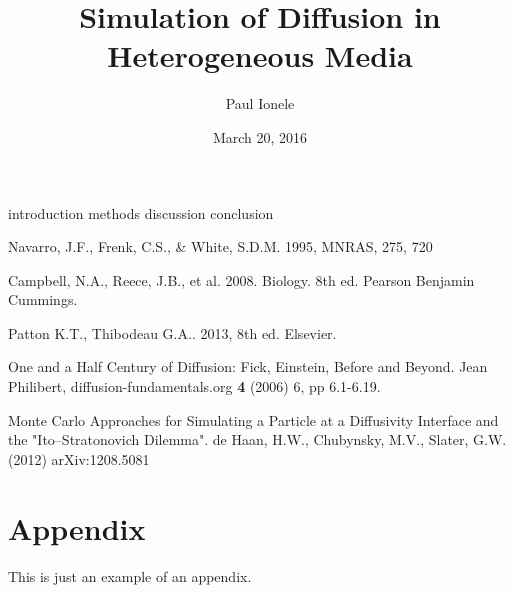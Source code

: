 \documentclass{jthesis}
\title{Simulation of Diffusion in Heterogeneous Media}
\date{March 20, 2016}
\author{Paul Ionele}
\begin{document}
\maketitle



\makedeclaration

\maketableofcontents

\doublespacing

{introduction}
\newpage
{methods}
\newpage
{discussion}
\newpage
{conclusion}

\begin{thebibliography}{}

 Navarro, J.F., Frenk, C.S., \& White, S.D.M.  1995, MNRAS, 275, 720

 Campbell, N.A., Reece, J.B., et al. 2008. Biology. 8th ed. Pearson Benjamin Cummings.

 Patton K.T., Thibodeau G.A.. 2013, 8th ed. Elsevier.

 One and a Half Century of Diffusion: Fick, Einstein, Before and Beyond. Jean Philibert, diffusion-fundamentals.org \textbf{4} (2006) 6, pp 6.1-6.19.

 Monte Carlo Approaches for Simulating a Particle at a Diffusivity Interface and the "Ito--Stratonovich Dilemma". de Haan, H.W., Chubynsky, M.V., Slater, G.W. (2012) arXiv:1208.5081

\end{thebibliography}

\appendix

\chapter{Appendix}
\label{app:sample}
This is just an example of an appendix.
\end{document}
